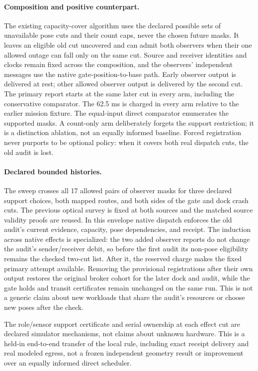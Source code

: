 \documentclass{article}
\begin{document}
\paragraph{Composition and positive counterpart.}
The existing capacity-cover algorithm uses the declared possible
sets of unavailable pose cuts and their count caps, never the
chosen future masks. It leaves an eligible old cut uncovered
and can admit both observers when their one allowed outage can
fall only on the same cut. Source and receiver identities and
clocks remain fixed across the composition, and the observers'
independent messages use the native gate-position-to-base path.
Early observer output is delivered at rest; other allowed
observer output is delivered by the second cut. The primary
report starts at the same later cut in every arm, including
the conservative comparator. The 62.5 ms is charged in every
arm relative to the earlier mission fixture. The equal-input
direct comparator enumerates the supported masks. A count-only
arm deliberately forgets the support restriction; it is a
distinction ablation, not an equally informed baseline.
Forced registration never purports to be optional policy:
when it covers both real dispatch cuts, the old audit is lost.

\paragraph{Declared bounded histories.}
The sweep crosses all 17 allowed pairs of observer masks for
three declared support choices, both mapped routes, and both
sides of the gate and dock crash cuts. The previous optical
survey is fixed at both sources and the matched source validity
proofs are reused. In this envelope native dispatch enforces
the old audit's current evidence, capacity, pose dependencies,
and receipt. The induction across native effects is specialized:
the two added observer reports do not change the audit's
sender/receiver debit, so before the first audit its non-pose
eligibility remains the checked two-cut list. After it, the
reserved charge makes the fixed primary attempt available.
Removing the provisional registrations after their own output
restores the original broker cohort for the later dock and
audit, while the gate holds and transit certificates remain
unchanged on the same run. This is not a generic claim about
new workloads that share the audit's resources or choose new
poses after the check.

The role/sensor support certificate and serial ownership at each
effect cut are declared simulator mechanisms, not claims about
unknown hardware. This is a held-in end-to-end transfer of the
local rule, including exact receipt delivery and real modeled
egress, not a frozen independent geometry result or improvement
over an equally informed direct scheduler.
\end{document}
